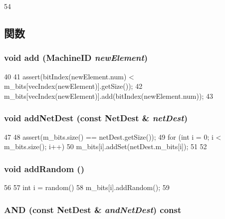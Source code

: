 \begin{DoxyCode}
54     { }
\end{DoxyCode}


\subsection{関数}
\hypertarget{classNetDest_afbaba944e1b52530702aad09dd563a79}{
\subsubsection[{add}]{\setlength{\rightskip}{0pt plus 5cm}void add ({\bf MachineID} {\em newElement})}}
\label{classNetDest_afbaba944e1b52530702aad09dd563a79}



\begin{DoxyCode}
40 {
41     assert(bitIndex(newElement.num) < m_bits[vecIndex(newElement)].getSize());
42     m_bits[vecIndex(newElement)].add(bitIndex(newElement.num));
43 }
\end{DoxyCode}
\hypertarget{classNetDest_a894c4ecd8db74ee23ec331048c9665bc}{
\subsubsection[{addNetDest}]{\setlength{\rightskip}{0pt plus 5cm}void addNetDest (const {\bf NetDest} \& {\em netDest})}}
\label{classNetDest_a894c4ecd8db74ee23ec331048c9665bc}



\begin{DoxyCode}
47 {
48     assert(m_bits.size() == netDest.getSize());
49     for (int i = 0; i < m_bits.size(); i++) {
50         m_bits[i].addSet(netDest.m_bits[i]);
51     }
52 }
\end{DoxyCode}
\hypertarget{classNetDest_abd48774eca8e19eb2371c41bdf73c93c}{
\subsubsection[{addRandom}]{\setlength{\rightskip}{0pt plus 5cm}void addRandom ()}}
\label{classNetDest_abd48774eca8e19eb2371c41bdf73c93c}



\begin{DoxyCode}
56 {
57     int i = random()%
58     m_bits[i].addRandom();
59 }
\end{DoxyCode}
\hypertarget{classNetDest_a682e493a493cef580f21f2fb26db3db1}{
\subsubsection[{AND}]{ AND (const {\bf NetDest} \& {\em andNetDest}) const}}
\label{classNetDest_a682e493a493cef580f21f2fb26db3db1}



